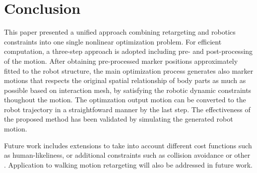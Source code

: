 \documentclass[letterpaper, 10 pt, conference]{ieeeconf}  %
\begin{document}
\section{Conclusion}
\label{sec:conclusion}

This paper presented a unified approach combining retargeting and
robotics constraints into one single nonlinear optimization
problem.
For efficient computation, a three-step approach is adopted including
pre- and post-processing of the motion.
After obtaining pre-processed marker positions approximately fitted to
the robot structure, the main optimization process generates 
also marker motions that respects the original spatial relationship of body
parts as much as possible based on interaction mesh, by satisfying the
robotic dynamic constraints thoughout the motion.
The optimzation output motion can be converted to the robot trajectory
in a straightfoward manner by the last step.
The effectiveness of the proposed method has been validated by
simulating the generated robot motion.

Future work includes extensions to take into account different cost
functions such as human-likeliness, or additional constraints such
as collision avoidance or other .
Application to walking motion retargeting will also be addressed in
future work.








%
%
\end{document}

